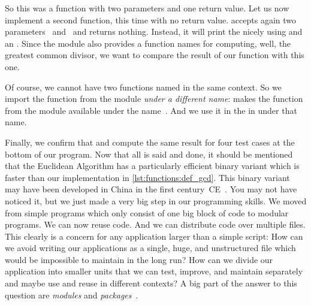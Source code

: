 So this was a function with two parameters and one return value.
Let us now implement a second function, this time with no return value.
 accepts again two parameters~ and~ and returns nothing.
Instead, it will print the  nicely using  and an .
Since the  module also provides a function names  for computing, well, the greatest common divisor, we want to compare the result of our function with this one.%
%
\begin{sloppypar}%
Of course, we cannot have two functions named  in the same context.
So we import the function from the  module \emph{under a different name}:
 makes the  function from the module  available under the name~.
And we use it in the  in  under that name.%
\end{sloppypar}%
%
Finally, we confirm that  and  compute the same result for four test cases at the bottom of our program.
Now that all is said and done, it should be mentioned that the Euclidean Algorithm has a particularly efficient binary variant which is faster than our implementation in \cref{lst:functions:def_gcd}.
This binary variant may have been developed in China in the first century~CE~\cite{B1999FAOTBEA}.%
%
\FloatBarrier%
\endhsection%
%
%
\label{sec:functionsInModules}%
%
%
%
%
You may not have noticed it, but we just made a very big step in our programming skills.
We moved from simple programs which only consist of one big block of code to modular programs.
We can now reuse code.
And we can distribute code over multiple files.
This clearly is a concern for any application larger than a simple script:
How can we avoid writing our applications as a single, huge, and unstructured file which would be impossible to maintain in the long run?
How can we divide our application into smaller units that we can test, improve, and maintain separately and maybe use and reuse in different contexts?
A big part of the answer to this question are \emph{modules} and \emph{packages}~\cite{PSF2024TIS}.

